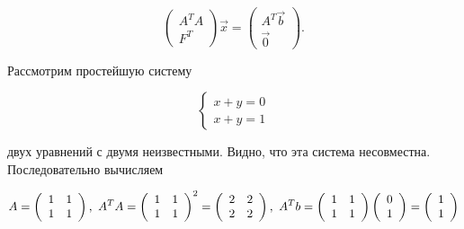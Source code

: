 \begin{equation*}
    \left(\begin{array}{c}
        A^TA \\
        F^T
    \end{array}\right)\vec{x}
    =
    \left(\begin{array}{c}
        A^T\vec{b} \\
        \vec{0}
    \end{array}\right)
.\end{equation*}

\begin{example}
    Рассмотрим простейшую систему

    \begin{equation}
        \begin{cases}
            x + y = 0 \\
            x + y = 1
        \end{cases}
    \end{equation}

    двух уравнений с двумя неизвестными. Видно, что эта система несовместна. Последовательно вычисляем

    \begin{equation}
        A = \left(\begin{array}{cc}
            1 & 1 \\
            1 & 1
        \end{array}\right), \thinspace \thinspace
        A^TA = \left(\begin{array}{cc}
            1 & 1 \\
            1 & 1
        \end{array}\right)^2 = \left(\begin{array}{cc}
            2 & 2 \\
            2 & 2
        \end{array}\right), \thinspace \thinspace
        A^Tb = \left(\begin{array}{cc}
            1 & 1 \\
            1 & 1
        \end{array}\right)\left(\begin{array}{c}
            0 \\
            1
        \end{array}\right) = \left(\begin{array}{c}
            1 \\
            1
        \end{array}\right)
    \end{equation}


\end{example}
